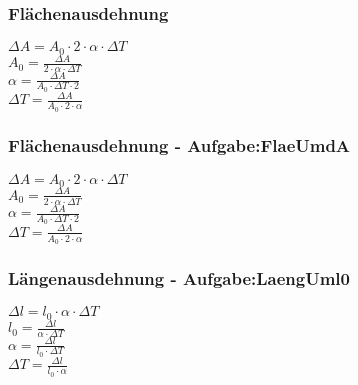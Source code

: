 \subsubsection{Flächenausdehnung} 
\begin{minipage}{0.45\textwidth} 
$ \Delta A = A_{0} \cdot 2\cdot \alpha \cdot \Delta T $\\ 
$ A_{0}  = \frac{ \Delta A}{2\cdot \alpha \cdot \Delta T} $\\ 
$ \alpha  = \frac{ \Delta A}{A_{0} \cdot \Delta T\cdot 2} $\\ 
$ \Delta T = \frac{ \Delta A}{A_{0} \cdot 2\cdot \alpha } $\\ 
\end{minipage} 
\begin{minipage}{0.45\textwidth} 
 
\end{minipage} 
\subsubsection{Flächenausdehnung - Aufgabe:FlaeUmdA} 
\begin{minipage}{0.45\textwidth} 
$ \Delta A = A_{0} \cdot 2\cdot \alpha \cdot \Delta T $\\ 
$ A_{0}  = \frac{ \Delta A}{2\cdot \alpha \cdot \Delta T} $\\ 
$ \alpha  = \frac{ \Delta A}{A_{0} \cdot \Delta T\cdot 2} $\\ 
$ \Delta T = \frac{ \Delta A}{A_{0} \cdot 2\cdot \alpha } $\\ 
\end{minipage} 
\begin{minipage}{0.45\textwidth} 
 
\end{minipage} 
\subsubsection{Längenausdehnung - Aufgabe:LaengUml0} 
\begin{minipage}{0.45\textwidth} 
$ \Delta l = l_{0} \cdot \alpha \cdot \Delta T $\\ 
$ l_{0}  = \frac{ \Delta l}{\alpha \cdot \Delta T} $\\ 
$ \alpha  = \frac{ \Delta l}{l_{0} \cdot \Delta T} $\\ 
$ \Delta T = \frac{ \Delta l}{l_{0} \cdot \alpha } $\\ 
\end{minipage} 
\begin{minipage}{0.45\textwidth} 
 
\end{minipage} 
